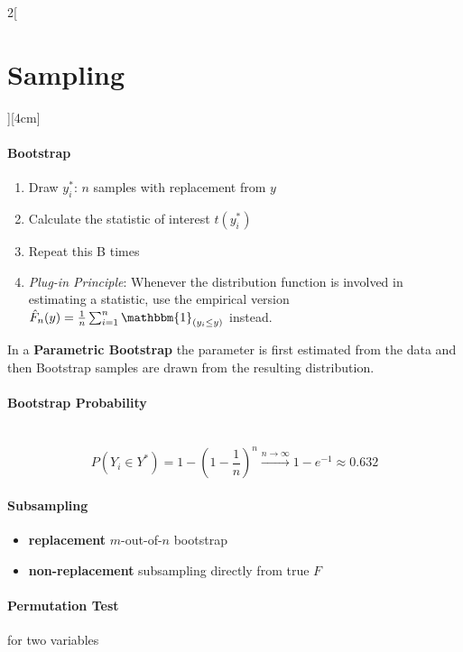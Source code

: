 \documentclass[8pt]{extarticle}
\begin{document}
\begin{multicols}{2}[\section{Sampling}][4cm]

\paragraph{Bootstrap}

\begin{enumerate}
\item Draw $y^*_i$: $n$ samples with replacement from $y$
\item Calculate the statistic of interest $t(y_i^*)$
\item Repeat this B times
\item \noindent \textit{Plug-in Principle}:
Whenever the distribution function is involved in estimating a statistic, use the empirical version $\hat{F}_n(y) = \frac{1}{n}\sum_{i=1}^n \mathbbm{1}_{(y_i\leq y)}$  instead.
\end{enumerate}

\noindent In a \textbf{Parametric Bootstrap} the parameter is first estimated from the data and then Bootstrap samples are drawn from the resulting distribution.

\paragraph{Bootstrap Probability} \ \\

$$P(Y_i\in Y^*) = 1-(1-\frac{1}{n})^n\overset{n\rightarrow\infty}{\rightarrow} 1-e^{-1} \approx 0.632$$


\paragraph{Subsampling}

\begin{itemize}
\item \textbf{replacement} $m$-out-of-$n$ bootstrap
\item \textbf{non-replacement} subsampling directly from true $F$
\end{itemize}

\paragraph{Permutation Test} for two variables


\end{multicols}
\end{document}
